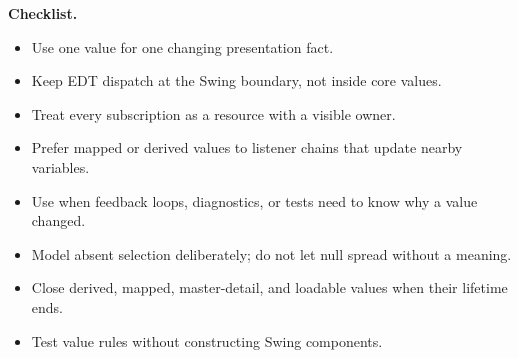\textbf{Checklist.}

\begin{itemize}
\item Use one value for one changing presentation fact.
\item Keep EDT dispatch at the Swing boundary, not inside core values.
\item Treat every subscription as a resource with a visible owner.
\item Prefer mapped or derived values to listener chains that update nearby
variables.
\item Use  when feedback loops, diagnostics, or tests need to
know why a value changed.
\item Model absent selection deliberately; do not let null spread without a
meaning.
\item Close derived, mapped, master-detail, and loadable values when their
lifetime ends.
\item Test value rules without constructing Swing components.
\end{itemize}
